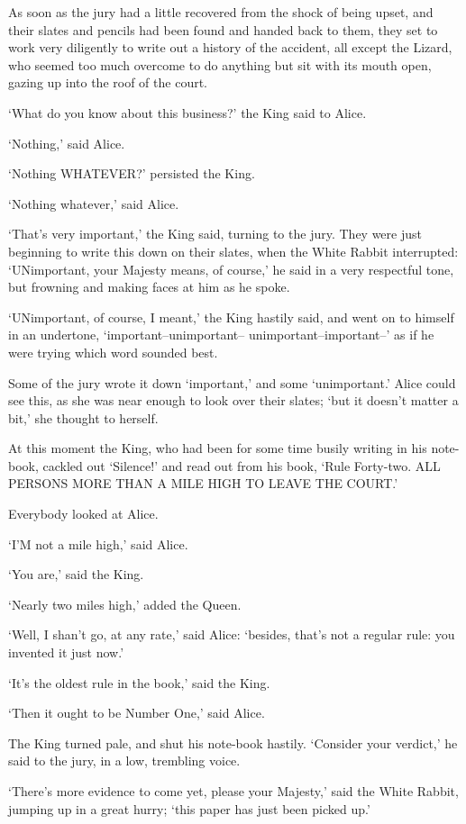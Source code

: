 \documentclass[12pt]{book}
\begin{document}
  As soon as the jury had a little recovered from the shock of
being upset, and their slates and pencils had been found and
handed back to them, they set to work very diligently to write
out a history of the accident, all except the Lizard, who seemed
too much overcome to do anything but sit with its mouth open,
gazing up into the roof of the court.

  `What do you know about this business?' the King said to
Alice.

  `Nothing,' said Alice.

  `Nothing WHATEVER?' persisted the King.

  `Nothing whatever,' said Alice.

  `That's very important,' the King said, turning to the jury.
They were just beginning to write this down on their slates, when
the White Rabbit interrupted:  `UNimportant, your Majesty means,
of course,' he said in a very respectful tone, but frowning and
making faces at him as he spoke.

  `UNimportant, of course, I meant,' the King hastily said, and
went on to himself in an undertone, `important--unimportant--
unimportant--important--' as if he were trying which word
sounded best.

  Some of the jury wrote it down `important,' and some
`unimportant.'  Alice could see this, as she was near enough to
look over their slates; `but it doesn't matter a bit,' she
thought to herself.

  At this moment the King, who had been for some time busily
writing in his note-book, cackled out `Silence!' and read out
from his book, `Rule Forty-two.  ALL PERSONS MORE THAN A MILE
HIGH TO LEAVE THE COURT.'

  Everybody looked at Alice.

  `I'M not a mile high,' said Alice.

  `You are,' said the King.

  `Nearly two miles high,' added the Queen.

  `Well, I shan't go, at any rate,' said Alice:  `besides,
that's not a regular rule:  you invented it just now.'

  `It's the oldest rule in the book,' said the King.

  `Then it ought to be Number One,' said Alice.

  The King turned pale, and shut his note-book hastily.
`Consider your verdict,' he said to the jury, in a low, trembling
voice.

  `There's more evidence to come yet, please your Majesty,' said
the White Rabbit, jumping up in a great hurry; `this paper has
just been picked up.'
\end{document}
